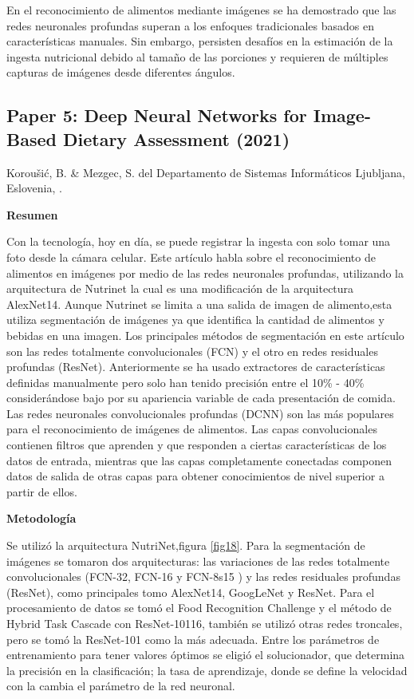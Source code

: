  En el reconocimiento de alimentos mediante imágenes se ha demostrado que las redes neuronales profundas superan a los enfoques tradicionales basados en características manuales. Sin embargo, persisten desafíos en la estimación de la ingesta nutricional debido al tamaño de las porciones y requieren de múltiples capturas de imágenes desde diferentes ángulos.

 \subsection{Paper 5: Deep Neural Networks for Image-Based Dietary Assessment (2021)} 

Koroušić, B. \&  Mezgec, S. del Departamento de Sistemas Informáticos Ljubljana, Eslovenia, \parencite{mezgec2021deep}.

\textbf{Resumen}

\thinspace
Con la tecnología, hoy en día, se puede registrar la ingesta con solo tomar una foto desde la cámara celular. Este artículo habla sobre el reconocimiento de alimentos en imágenes por medio de las redes neuronales profundas, utilizando la arquitectura de Nutrinet la cual es una modificación de la arquitectura AlexNet14. Aunque Nutrinet se limita a una salida de imagen de alimento,esta utiliza segmentación de imágenes ya que identifica la cantidad de alimentos y bebidas en una imagen. Los principales métodos de segmentación en este artículo son las redes totalmente convolucionales (FCN) y el otro en redes residuales profundas (ResNet). Anteriormente se ha usado extractores de características definidas manualmente pero solo han tenido precisión entre el 10\% - 40\% considerándose bajo por su apariencia variable de cada presentación de comida. Las redes neuronales convolucionales profundas (DCNN) son las más populares para el reconocimiento de imágenes de alimentos. Las capas convolucionales contienen filtros que aprenden y que responden a ciertas características de los datos de entrada, mientras que las capas completamente conectadas componen datos de salida de otras capas para obtener conocimientos de nivel superior a partir de ellos. 

\textbf{Metodología}

\thinspace
Se utilizó la arquitectura NutriNet,figura \ref{fig18}. Para la segmentación de imágenes se tomaron dos arquitecturas: las variaciones de las redes totalmente convolucionales (FCN-32, FCN-16 y FCN-8s15 ) y las redes residuales profundas (ResNet), como principales tomo AlexNet14, GoogLeNet y ResNet. Para el procesamiento de datos se tomó el Food Recognition Challenge y el método de Hybrid Task Cascade con ResNet-10116, también se utilizó otras redes troncales, pero se tomó la ResNet-101 como la más adecuada. Entre los parámetros de entrenamiento para tener valores óptimos se eligió el solucionador, que determina la precisión en la clasificación; la tasa de aprendizaje, donde se define la velocidad con la cambia el parámetro de la red neuronal. 

